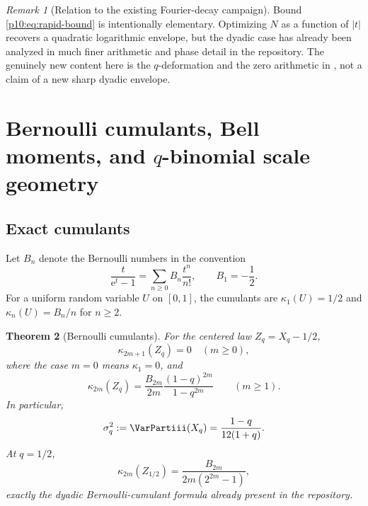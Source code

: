 \documentclass[11pt]{article}
\numberwithin{equation}{section}
\newtheorem{theorem}{Theorem}[section]
\theoremstyle{definition}
\theoremstyle{remark}
\newtheorem{remark}[theorem]{Remark}
\newcommand{\e}{\mathrm e}
\begin{document}
\begin{remark}[Relation to the existing Fourier-decay campaign]
Bound \eqref{p10:eq:rapid-bound} is intentionally elementary.  Optimizing $N$ as a function of
$|t|$ recovers a quadratic logarithmic envelope, but the dyadic case has already been
analyzed in much finer arithmetic and phase detail in the repository.  The genuinely new
content here is the $q$-deformation and the zero arithmetic in , not a claim
of a new sharp dyadic envelope.
\end{remark}

\section{Bernoulli cumulants, Bell moments, and \texorpdfstring{$q$}{q}-binomial scale geometry}
\label{p10:sec:bell}

\subsection{Exact cumulants}

Let $B_n$ denote the Bernoulli numbers in the convention
\[
 \frac{t}{\e^t-1}=\sum_{n\ge0}B_n\frac{t^n}{n!},
 \qquad B_1=-\frac12.
\]
For a uniform random variable $U$ on $[0,1]$, the cumulants are
$\kappa_1(U)=1/2$ and $\kappa_n(U)=B_n/n$ for $n\ge2$.

\begin{theorem}[Bernoulli cumulants]
\label{p10:thm:cumulants}
For the centered law $Z_q=X_q-1/2$,
\begin{equation}
 \kappa_{2m+1}(Z_q)=0\quad(m\ge0),                            \label{p10:eq:odd-cumulants}
\end{equation}
where the case $m=0$ means $\kappa_1=0$, and
\begin{equation}
 \boxed{\displaystyle
 \kappa_{2m}(Z_q)
 =\frac{B_{2m}}{2m}\frac{(1-q)^{2m}}{1-q^{2m}}}
 \qquad(m\ge1).                                             \label{p10:eq:q-cumulants}
\end{equation}
In particular,
\begin{equation}
 \sigma_q^2:=\VarPartiii(X_q)=\frac{1-q}{12(1+q)}.                  \label{p10:eq:variance}
\end{equation}
At $q=1/2$,
\begin{equation}
 \kappa_{2m}(Z_{1/2})
 =\frac{B_{2m}}{2m(2^{2m}-1)},                               \label{p10:eq:dyadic-cumulants}
\end{equation}
exactly the dyadic Bernoulli-cumulant formula already present in the repository.
\end{theorem}
\end{document}
